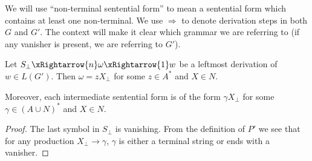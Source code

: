 \documentclass[12pt]{article}
\begin{document}
\begin{solution}
    We will use ``non-terminal sentential form'' to mean a sentential form
    which contains at least one non-terminal.
    We use $\Rightarrow$ to denote derivation steps in both $G$ and $G'$.
    The context will make it clear which grammar we are referring to
    (if any vanisher is present, we are referring to $G'$).

    \begin{lemma} \label{thm:trail}
        Let $S_\bot \xRightarrow{n} \omega \xRightarrow{1} w$ be a
        leftmost derivation of $w \in L(G')$.
        Then $\omega = z X_\bot$ for some $z \in A^*$ and $X \in N$.

        Moreover, each intermediate sentential form is of the form
        $\gamma X_\bot$ for some $\gamma \in (A \cup N)^*$ and $X \in N$.
    \end{lemma}
    \begin{proof}
        The last symbol in $S_\bot$ is vanishing.
        From the definition of $P'$ we see that for any production
        $X_\bot \to \gamma$, $\gamma$ is either a terminal string or
        ends with a vanisher.


\end{proof}
\end{solution}
\end{document}
